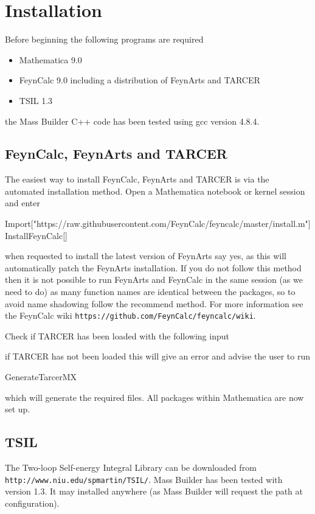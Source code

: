 \section{Installation}

Before beginning the following programs are required
\begin{itemize}
\item Mathematica 9.0
\item FeynCalc 9.0 including a distribution of FeynArts and TARCER
\item TSIL 1.3
\end{itemize}
the Mass Builder C++ code has been tested using gcc version 4.8.4.

\subsection{FeynCalc, FeynArts and TARCER}

The easiest way to install FeynCalc, FeynArts and TARCER is via the automated installation method.  Open a Mathematica notebook or kernel session and enter
\begin{lstterm}
Import["https://raw.githubusercontent.com/FeynCalc/feyncalc/master/install.m"]
InstallFeynCalc[]
\end{lstterm}

when requested to install the latest version of FeynArts say yes, as this will automatically patch the FeynArts installation.  If you do not follow this method then it is not possible to run FeynArts and FeynCalc in the same session (as we need to do) as many function names are identical between the packages, so to avoid name shadowing follow the recommend method.  For more information see the FeynCalc wiki \lstinline{https://github.com/FeynCalc/feyncalc/wiki}.

Check if TARCER has been loaded with the following input
if TARCER has not been loaded this will give an error and advise the user to run
\begin{lstterm}
GenerateTarcerMX
\end{lstterm}
which will generate the required files.  All packages within Mathematica are now set up.

\subsection{TSIL}
The Two-loop Self-energy Integral Library can be downloaded from \lstinline{http://www.niu.edu/spmartin/TSIL/}.  Mass Builder has been tested with version 1.3. It may installed anywhere (as Mass Builder will request the path at configuration).

